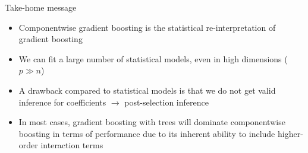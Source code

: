 \documentclass[11pt,compress,t,notes=noshow, xcolor=table]{beamer}
\begin{document}
\begin{vbframe}{Take-home message}

\begin{itemize}
  \item Componentwise gradient boosting is the statistical re-interpretation of
  gradient boosting
  \item We can fit a large number of statistical models, even in high dimensions
  ($p \gg n$)
  \item A drawback compared to statistical models is that we do not get valid
  inference for coefficients $\rightarrow$ post-selection inference
  \item In most cases, gradient boosting with trees will dominate componentwise
  boosting in terms of performance due to its inherent ability to include
  higher-order interaction terms
\end{itemize}

\end{vbframe}


\endlecture
\end{document}
